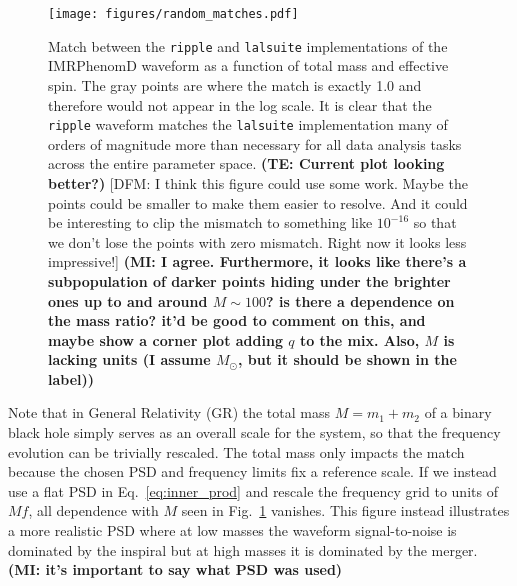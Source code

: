\documentclass[twocolumn]{aastex631}
\newcommand{\ripple}{\texttt{ripple}\xspace}
\newcommand{\lalsuite}{\texttt{lalsuite}\xspace}
\newcommand{\te}[1]{\textbf{\color{pyGreen}(TE: #1)}}
\newcommand{\AZ}[1]{{\color{Burnt}[AZ: #1]}}
\newcommand{\mi}[1]{\textbf{\color{teal}(MI: #1)}}
\newcommand{\dfm}[1]{{\color{dfm}[DFM: #1]}}
\begin{document}
\begin{figure}[t]
    \begin{centering}
        \texttt{[image: figures/random\_matches.pdf]}
        \caption{
            Match between the \ripple and \lalsuite implementations of the IMRPhenomD waveform as a function of total mass and effective spin. 
            The gray points are where the match is exactly 1.0 and therefore would not appear in the log scale.
            It is clear that the \ripple waveform matches the \lalsuite implementation many of orders of magnitude more than necessary for all data analysis tasks across the entire parameter space.
            \te{Current plot looking better?}
            \dfm{I think this figure could use some work. Maybe the points could be smaller to make them easier to resolve. And it could be interesting to clip the mismatch to something like $10^{-16}$ so that we don't lose the points with zero mismatch. Right now it looks less impressive!}
            \mi{I agree. Furthermore, it looks like there's a subpopulation of darker points hiding under the brighter ones up to and around $M \sim 100$? is there a dependence on the mass ratio? it'd be good to comment on this, and maybe show a corner plot adding $q$ to the mix. Also, $M$ is lacking units (I assume $M_\odot$, but it should be shown in the label)}
        }
        \label{fig:match}
    \end{centering}
\end{figure}

Note that in General Relativity (GR) the total mass $M = m_1 + m_2$ of a binary black hole simply serves as an overall scale for the system, so that the frequency evolution can be trivially rescaled.
The total mass only impacts the match because the chosen PSD and frequency limits fix a reference scale.
If we instead use a flat PSD in Eq.~\ref{eq:inner_prod} and rescale the frequency grid to units of $Mf$, all dependence with $M$ seen in Fig.~\ref{fig:match} vanishes. 
This figure instead illustrates a more realistic PSD where at low masses the waveform signal-to-noise is dominated by the inspiral but at high masses it is dominated by the merger.
\mi{it's important to say what PSD was used}
\end{document}
